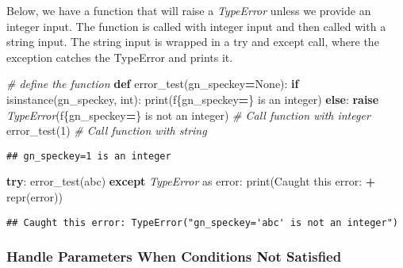 \documentclass[
]{book}
\newenvironment{Shaded}{\begin{snugshade}}{\end{snugshade}}
\newcommand{\BuiltInTok}[1]{#1}
\newcommand{\CommentTok}[1]{\textcolor[rgb]{0.56,0.35,0.01}{\textit{#1}}}
\newcommand{\ControlFlowTok}[1]{\textcolor[rgb]{0.13,0.29,0.53}{\textbf{#1}}}
\newcommand{\DecValTok}[1]{\textcolor[rgb]{0.00,0.00,0.81}{#1}}
\newcommand{\ImportTok}[1]{#1}
\newcommand{\KeywordTok}[1]{\textcolor[rgb]{0.13,0.29,0.53}{\textbf{#1}}}
\newcommand{\NormalTok}[1]{#1}
\newcommand{\OperatorTok}[1]{\textcolor[rgb]{0.81,0.36,0.00}{\textbf{#1}}}
\newcommand{\PreprocessorTok}[1]{\textcolor[rgb]{0.56,0.35,0.01}{\textit{#1}}}
\newcommand{\SpecialCharTok}[1]{\textcolor[rgb]{0.00,0.00,0.00}{#1}}
\newcommand{\SpecialStringTok}[1]{\textcolor[rgb]{0.31,0.60,0.02}{#1}}
\newcommand{\StringTok}[1]{\textcolor[rgb]{0.31,0.60,0.02}{#1}}
\newcommand{\VariableTok}[1]{\textcolor[rgb]{0.00,0.00,0.00}{#1}}
\begin{document}
Below, we have a function that will raise a \emph{TypeError} unless we provide an integer input. The function is called with integer input and then called with a string input. The string input is wrapped in a try and except call, where the exception catches the TypeError and prints it.

\begin{Shaded}
\begin{Highlighting}[]
\CommentTok{\# define the function}
\KeywordTok{def}\NormalTok{ error\_test(gn\_speckey}\OperatorTok{=}\VariableTok{None}\NormalTok{):}
    \ControlFlowTok{if} \BuiltInTok{isinstance}\NormalTok{(gn\_speckey, }\BuiltInTok{int}\NormalTok{):}
        \BuiltInTok{print}\NormalTok{(}\SpecialStringTok{f\textquotesingle{}}\SpecialCharTok{\{}\NormalTok{gn\_speckey}\OperatorTok{=}\SpecialCharTok{\}}\SpecialStringTok{ is an integer\textquotesingle{}}\NormalTok{)}
    \ControlFlowTok{else}\NormalTok{:}
        \ControlFlowTok{raise} \PreprocessorTok{TypeError}\NormalTok{(}\SpecialStringTok{f\textquotesingle{}}\SpecialCharTok{\{}\NormalTok{gn\_speckey}\OperatorTok{=}\SpecialCharTok{\}}\SpecialStringTok{ is not an integer\textquotesingle{}}\NormalTok{)}
\CommentTok{\# Call function with integer}
\NormalTok{error\_test(}\DecValTok{1}\NormalTok{)}
\CommentTok{\# Call function with string}
\end{Highlighting}
\end{Shaded}

\begin{verbatim}
## gn_speckey=1 is an integer
\end{verbatim}

\begin{Shaded}
\begin{Highlighting}[]
\ControlFlowTok{try}\NormalTok{:}
\NormalTok{    error\_test(}\StringTok{\textquotesingle{}abc\textquotesingle{}}\NormalTok{)}
\ControlFlowTok{except} \PreprocessorTok{TypeError} \ImportTok{as}\NormalTok{ error:}
    \BuiltInTok{print}\NormalTok{(}\StringTok{\textquotesingle{}Caught this error: \textquotesingle{}} \OperatorTok{+} \BuiltInTok{repr}\NormalTok{(error))}
\end{Highlighting}
\end{Shaded}

\begin{verbatim}
## Caught this error: TypeError("gn_speckey='abc' is not an integer")
\end{verbatim}

\hypertarget{handle-parameters-when-conditions-not-satisfied}{%
\subsubsection{Handle Parameters When Conditions Not Satisfied}\label{handle-parameters-when-conditions-not-satisfied}}
\end{document}
